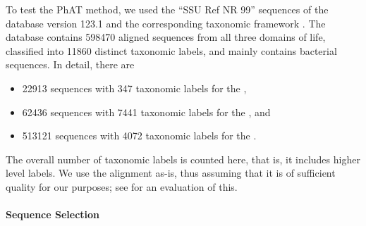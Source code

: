 To test the \acf{PhAT} method,
we used the ``SSU Ref NR 99'' sequences of the  database \citep{Quast2013} version 123.1
and the corresponding taxonomic framework \citep{Yilmaz2014}.
The database contains \num{598 470} aligned sequences from all three domains of life,
classified into \num{11 860} distinct taxonomic labels,
and mainly contains bacterial sequences.
In detail, there are
\begin{itemize}
    \item \num{ 22 913} sequences with \num{  347} taxonomic labels for the ,
    \item \num{ 62 436} sequences with \num{7 441} taxonomic labels for the , and
    \item \num{513 121} sequences with \num{4 072} taxonomic labels for the .
\end{itemize}
The overall number of taxonomic labels is counted here, that is, it includes higher level labels.
We use the  alignment as-is, thus assuming that it is of sufficient quality for our purposes;
see  for an evaluation of this.



\paragraph{Sequence Selection}
\label{ch:AutomaticTrees:sec:Evaluation:sub:ReferenceTreeSetup:par:SequenceSelection}

